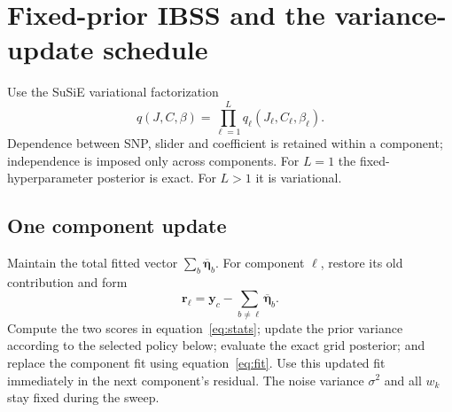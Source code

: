 \documentclass[11pt]{article}
\newcommand{\yb}{\mathbf y_c}
\newcommand{\etal}{\overline{\boldsymbol\eta}}
\begin{document}
\section{Fixed-prior IBSS and the variance-update schedule}
\label{sec:ibss}
Use the SuSiE variational factorization
\begin{equation}
 q(J,C,\beta)=\prod_{\ell=1}^Lq_\ell(J_\ell,C_\ell,\beta_\ell).
 \label{eq:q}
\end{equation}
Dependence between SNP, slider and coefficient is retained within a
component; independence is imposed only across components. For $L=1$
the fixed-hyperparameter posterior is exact. For $L>1$ it is variational.

\subsection{One component update}
Maintain the total fitted vector $\sum_b\etal_b$. For component $\ell$,
restore its old contribution and form
\begin{equation}
 \mathbf r_\ell=\yb-\sum_{b\ne\ell}\etal_b.
 \label{eq:residual}
\end{equation}
Compute the two scores in equation~\eqref{eq:stats}; update the prior
variance according to the selected policy below; evaluate the exact grid
posterior; and replace the component fit using equation~\eqref{eq:fit}.
Use this updated fit immediately in the next component's residual.
The noise variance $\sigma^2$ and all $w_k$ stay fixed during the sweep.
\end{document}
